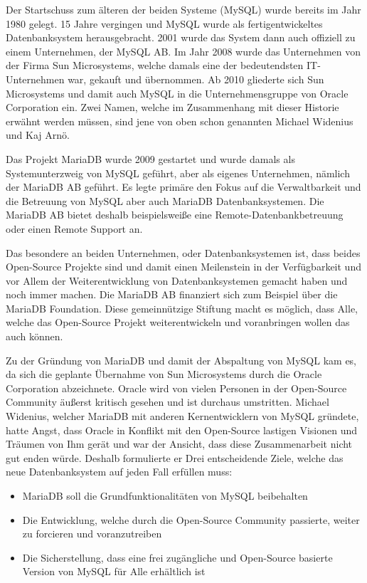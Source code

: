 
Der Startschuss zum älteren der beiden Systeme (MySQL) wurde bereits im Jahr 1980 gelegt. 15 Jahre vergingen und MySQL wurde als fertigentwickeltes Datenbanksystem herausgebracht. 2001 wurde das System dann auch offiziell zu einem Unternehmen, der MySQL AB. Im Jahr 2008 wurde das Unternehmen von der Firma Sun Microsystems, welche damals eine der bedeutendsten IT-Unternehmen war, gekauft und übernommen. Ab 2010 gliederte sich Sun Microsystems und damit auch MySQL in die Unternehmensgruppe von Oracle Corporation ein. Zwei Namen, welche im Zusammenhang mit dieser Historie erwähnt werden müssen, sind jene von oben schon genannten Michael Widenius und Kaj Arnö.

Das Projekt MariaDB wurde 2009 gestartet und wurde damals als Systemunterzweig von MySQL geführt, aber als eigenes Unternehmen, nämlich der MariaDB AB geführt. Es legte primäre den Fokus auf die Verwaltbarkeit und die Betreuung von MySQL aber auch MariaDB Datenbanksystemen. Die MariaDB AB bietet deshalb beispielsweiße eine Remote-Datenbankbetreuung oder einen Remote Support an.

Das besondere an beiden Unternehmen, oder Datenbanksystemen ist, dass beides Open-Source Projekte sind und damit einen Meilenstein in der Verfügbarkeit und vor Allem der Weiterentwicklung von Datenbanksystemen gemacht haben und noch immer machen. Die MariaDB AB finanziert sich zum Beispiel über die MariaDB Foundation. Diese gemeinnützige Stiftung macht es möglich, dass Alle, welche das Open-Source Projekt weiterentwickeln und voranbringen wollen das auch können.

Zu der Gründung von MariaDB und damit der Abspaltung von MySQL kam es, da sich die geplante Übernahme von Sun Microsystems durch die Oracle Corporation abzeichnete. Oracle wird von vielen Personen in der Open-Source Community äußerst kritisch gesehen und ist durchaus umstritten. Michael Widenius, welcher MariaDB mit anderen Kernentwicklern von MySQL gründete, hatte Angst, dass Oracle in Konflikt mit den Open-Source lastigen Visionen und Träumen von Ihm gerät und war der Ansicht, dass diese Zusammenarbeit nicht gut enden würde. Deshalb formulierte er Drei entscheidende Ziele, welche das neue Datenbanksystem auf jeden Fall erfüllen muss:

\begin{itemize}
    \item MariaDB soll die Grundfunktionalitäten von MySQL beibehalten
    \item Die Entwicklung, welche durch die Open-Source Community passierte, weiter zu forcieren und voranzutreiben
    \item Die Sicherstellung, dass eine frei zugängliche und Open-Source basierte Version von MySQL für Alle erhältlich ist
\end{itemize}
